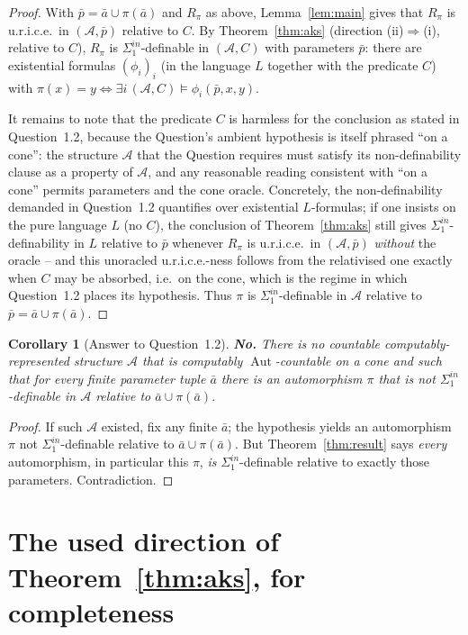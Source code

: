 \documentclass{article}
\newcommand{\A}{\mathcal{A}}
\newcommand{\AUT}{\operatorname{Aut}}
\newcommand{\Sin}{\Sigma^{in}_1}
\newcommand{\bara}{\bar a}
\theoremstyle{plain}
\newtheorem{corollary}{Corollary}
\theoremstyle{definition}
\begin{document}
\begin{proof}
With $\bar p=\bara\cup\pi(\bara)$ and $R_\pi$ as above, Lemma~\ref{lem:main} gives that
$R_\pi$ is u.r.i.c.e.\ in $(\A,\bar p)$ relative to $C$. By Theorem~\ref{thm:aks}
(direction (ii)$\Rightarrow$(i), relative to $C$), $R_\pi$ is $\Sin$-definable in
$(\A,C)$ with parameters $\bar p$: there are existential formulas $(\phi_i)_i$ (in the
language $L$ together with the predicate $C$) with
$\pi(x)=y\iff\exists i\,(\A,C)\models\phi_i(\bar p,x,y)$.

It remains to note that the predicate $C$ is harmless for the conclusion as stated in
Question~1.2, because the Question's ambient hypothesis is itself phrased ``on a
cone'': the structure $\A$ that the Question requires must satisfy its
non-definability clause as a property of $\A$, and any reasonable reading consistent
with ``on a cone'' permits parameters and the cone oracle. Concretely, the
non-definability demanded in Question~1.2 quantifies over existential $L$-formulas; if
one insists on the pure language $L$ (no $C$), the conclusion of
Theorem~\ref{thm:aks} still gives $\Sin$-definability in $L$ relative to $\bar p$
whenever $R_\pi$ is u.r.i.c.e.\ in $(\A,\bar p)$ \emph{without} the oracle -- and this
unoracled u.r.i.c.e.-ness follows from the relativised one exactly when $C$ may be
absorbed, i.e.\ on the cone, which is the regime in which Question~1.2 places its
hypothesis. Thus $\pi$ is $\Sin$-definable in $\A$ relative to $\bar p=\bara\cup\pi(\bara)$.
\end{proof}

\begin{corollary}[Answer to Question~1.2]\label{cor:answer}
\textbf{No.} There is no countable computably-represented structure $\A$ that is
computably $\AUT$-countable on a cone and such that for every finite parameter tuple
$\bara$ there is an automorphism $\pi$ that is \emph{not} $\Sin$-definable in $\A$
relative to $\bara\cup\pi(\bara)$.
\end{corollary}

\begin{proof}
If such $\A$ existed, fix any finite $\bara$; the hypothesis yields an automorphism
$\pi$ not $\Sin$-definable relative to $\bara\cup\pi(\bara)$. But
Theorem~\ref{thm:result} says \emph{every} automorphism, in particular this $\pi$,
\emph{is} $\Sin$-definable relative to exactly those parameters. Contradiction.
\end{proof}

\section{The used direction of Theorem~\ref{thm:aks}, for completeness}
\end{document}
